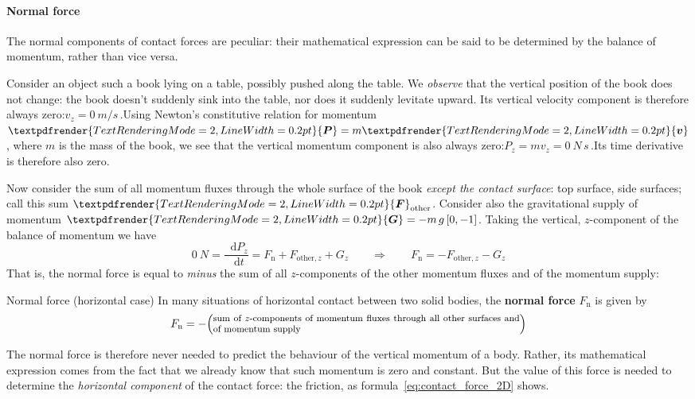 \documentclass[a4paper,12pt,%
onecolumn,oneside,%
british%
]{memoir}
\renewcommand*{\bm}[1]{\textpdfrender{TextRenderingMode=2,LineWidth=0.2pt}{\boldsymbol{#1}}}
\newcommand*{\di}{\mathop{}\!\mathrm{d}}%
\renewcommand*{\|}[1][]{\nonscript\:#1\vert\nonscript\:\mathopen{}}
\newcommand*{\yv}{\bm{v}}
\newcommand*{\dt}{\di t}
\newcommand*{\ym}{m}%
\newcommand*{\yP}{\bm{P}}
\newcommand*{\yF}{\bm{F}}
\newcommand*{\yFn}{F_{\textrm{n}}}
\newcommand*{\yFr}{\yF_{\textrm{other}}}
\newcommand*{\yFrz}{F_{\textrm{other},z}}
\newcommand*{\yG}{\bm{G}}
\begin{document}
\paragraph{Normal force}
\label{sec:normal_force}

The normal components of contact forces are peculiar: their mathematical expression can be said to be determined by the balance of momentum, rather than vice versa.

Consider an object such a book lying on a table, possibly pushed along the table. We \emph{observe} that the vertical position of the book does not change: the book doesn't suddenly sink into the table, nor does it suddenly levitate upward. Its vertical velocity component is therefore always zero:\enskip$v_{z} = \qty{0}{m/s}$\,.\enskip Using Newton's constitutive relation for momentum $\yP=\ym\yv$, where $\ym$ is the mass of the book, we see that the vertical momentum component is also always zero:\enskip$P_{z}=\ym v_{z} = \qty{0}{N\,s}$\,.\enskip Its time derivative is therefore also zero.

Now consider the sum of all momentum fluxes through the whole surface of the book \emph{except the contact surface}: top surface, side surfaces; call this sum $\yFr$. Consider also the gravitational supply of momentum $\yG=-\ym\,g\,[0,-1]$. Taking the vertical, $z$-component of the balance of momentum we have
\begin{equation*}
  \qty{0}{N} =
  \frac{\di P_{z}}{\dt}
  = \yFn + \yFrz + G_{z}
\qquad  \Longrightarrow\qquad
  \yFn = - \yFrz - G_{z}
\end{equation*}
That is, the normal force is equal to \emph{minus} the sum of all $z$-components of the other momentum fluxes and of the momentum supply:
\begin{definition}{Normal force (horizontal case)}\label{def:normalforce}
  In many situations of horizontal contact between two solid bodies, the \textbf{normal force} $\yFn$ is given by
  \begin{equation*}
    \yFn = -\Bigl(\parbox{0.8\linewidth}{\footnotesize sum of $z$-components of momentum fluxes through all other surfaces and of momentum supply}\Bigr)
  \end{equation*}
\end{definition}

The normal force is therefore never needed to predict the behaviour of the vertical momentum of a body. Rather, its mathematical expression comes from the fact that we already know that such momentum is zero and constant. But the value of this force is needed to determine the \emph{horizontal component} of the contact force: the friction, as formula~\eqref{eq:contact_force_2D} shows.
\end{document}
